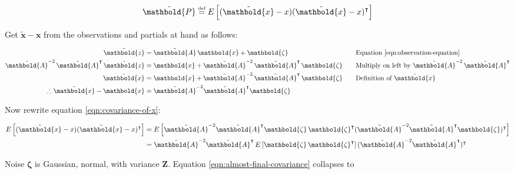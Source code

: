 \documentclass[10pt,oneside,x11names]{article}
\begin{document}
\begin{align}
\label{eqn:covariance-of-x}
\tilde{\mathbold{P}}
\stackrel{\text{\tiny def}}{=}
E
\left[
(\tilde{\mathbold{x}}-x)
(\tilde{\mathbold{x}}-x)^\intercal
\right]
\end{align}

\noindent  Get \(\tilde{\mathbold{x}}-\mathbold{x}\)
from the observations and partials at hand as follows:

\begin{alignat}{6}
\notag
{\tilde{\mathbold{z}}}
&=
{\tilde{\mathbold{A}}}\,
\mathbold{x} + 
\mathbold{\zeta}
&&
\quad\text{Equation \ref{eqn:observation-equation}}
\\
\notag
{\tilde{\mathbold{A}}}^{-2}\,
{\tilde{\mathbold{A}}}^\intercal\,
{\tilde{\mathbold{z}}}
&=
\mathbold{x} + 
{\tilde{\mathbold{A}}}^{-2}\,
{\tilde{\mathbold{A}}}^\intercal\,
\mathbold{\zeta}
&&
\quad\text{Multiply on left by }{\tilde{\mathbold{A}}}^{-2}\,\tilde{\mathbold{A}}^\intercal
\\
\notag
\tilde{\mathbold{x}}
&=
\mathbold{x} +
{\tilde{\mathbold{A}}}^{-2}\,
{\tilde{\mathbold{A}}}^\intercal\,
\mathbold{\zeta}
&&
\quad\text{Definition of }{\tilde{\mathbold{x}}}
\\
\notag
\therefore
\tilde{\mathbold{x}} -
\mathbold{x} &=
{\tilde{\mathbold{A}}}^{-2}
{\tilde{\mathbold{A}}}^\intercal
\mathbold{\zeta}
\end{alignat}

\noindent
Now rewrite equation \ref{eqn:covariance-of-x}:

\begin{align}
\notag
E
\left[
(\tilde{\mathbold{x}}-x)
(\tilde{\mathbold{x}}-x)^\intercal
\right] &=
E
\left[
{\tilde{\mathbold{A}}}^{-2}
{\tilde{\mathbold{A}}}^\intercal
\mathbold{\zeta}\,
\mathbold{\zeta}^\intercal
({\tilde{\mathbold{A}}}^{-2}
{\tilde{\mathbold{A}}}^\intercal
\mathbold{\zeta})^\intercal
\right] \\
\label{eqn:almost-final-covariance}
&=
{\tilde{\mathbold{A}}}^{-2}
{\tilde{\mathbold{A}}}^\intercal\,
E\left[
\mathbold{\zeta}\,
\mathbold{\zeta}^\intercal
\right]
({\tilde{\mathbold{A}}}^{-2}
{\tilde{\mathbold{A}}}^\intercal)^\intercal
\end{align}

\noindent  Noise \(\mathbold{\zeta}\) is Gaussian, normal, with variance \(\mathbold{Z}\).
Equation \ref{eqn:almost-final-covariance} collapses to
\end{document}

